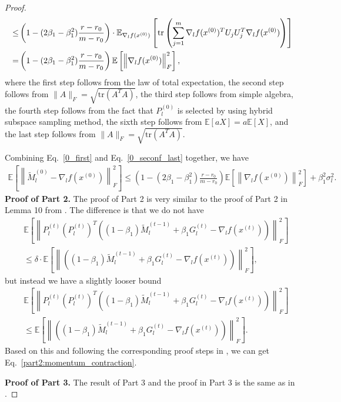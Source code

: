 \begin{proof}
\begin{align}
\le&\left(1-(2\beta_1-\beta_1^2)\frac{r-r_0}{m-r_0}\right) \cdot\mathbb{E}_{\nabla_{l}f(x^{(0)})}\left [   \mathrm{tr} \left(\sum_{j=1}^{m} \nabla_lf(x^{(0)})^T U_jU_j^T\nabla_lf(x^{(0)}) \right) \right ] \notag\\
=&\left(1-(2\beta_1-\beta_1^2)\frac{r-r_0}{m-r_0} \right)\mathbb{E}\left [ \left \| \nabla_lf(x^{(0)}) \right \|_F^2  \right ],
\end{align}
where the first step follows from the law of total expectation, the second step follows from $\|A\|_F = \sqrt{\mathrm{tr}(A^T A)}$, the third step follows from simple algebra, the fourth step follows from the fact that $P_l^{(0)}$ is selected by using hybrid subspace sampling method, the sixth step follows from $\mathbb{E}[aX] = a\mathbb{E}[X]$, and the last step follows from $\|A\|_F = \sqrt{\mathrm{tr}(A^T A)}$.


Combining Eq.~\eqref{0_first} and Eq.~\eqref{0_seconf_last} together, we have 
\begin{align}
    \mathbb{E}\left [ \left \| \tilde {M}_l^{(0)} -\nabla _lf(x^{(0)})\right \|_F^2  \right ] \le
    \left(1-(2\beta_1-\beta_1^2)\frac{r-r_0}{m-r_0} \right)\mathbb{E}\left [ \left \| \nabla_lf(x^{(0)}) \right \|_F^2  \right ]
    + \beta_1^2\sigma_l^2.
\end{align}
{\bf Proof of Part 2.}
The proof of Part 2 is very similar to the proof of Part 2 in Lemma 10 from \cite{he2024subspace}. The difference is that we do not have 
\begin{align*}
&\mathbb{E}\left [ \left \| P_l^{(t)}(P_l^{(t)})^T\left((1-\beta_1)\tilde{M}_l^{(t-1)} + \beta_1G_l^{(t)}- \nabla _l f(x^{(t)})\right) \right \| _F^2 \right ]\\
&\leq \delta \cdot\mathbb{E}\left [ \left \| \left((1-\beta_1)\tilde{M}_l^{(t-1)} + \beta_1G_l^{(t)}- \nabla _l f(x^{(t)})\right) \right \| _F^2 \right ],
\end{align*}
but instead we have a slightly looser bound
\begin{align*}
&\mathbb{E}\left [ \left \| P_l^{(t)}(P_l^{(t)})^T\left((1-\beta_1)\tilde{M}_l^{(t-1)} + \beta_1G_l^{(t)}- \nabla _l f(x^{(t)})\right) \right \| _F^2 \right ]\\
&\leq \mathbb{E}\left [ \left \| \left((1-\beta_1)\tilde{M}_l^{(t-1)} + \beta_1G_l^{(t)}- \nabla _l f(x^{(t)})\right) \right \| _F^2 \right ].
\end{align*}
Based on this and following the corresponding proof steps in \cite{he2024subspace}, we can get Eq.~\eqref{part2:momentum_contraction}.

{\bf Proof of Part 3.}
The result of Part 3 and the proof in Part 3 is the same as in \cite{he2024subspace}.
\end{proof}

